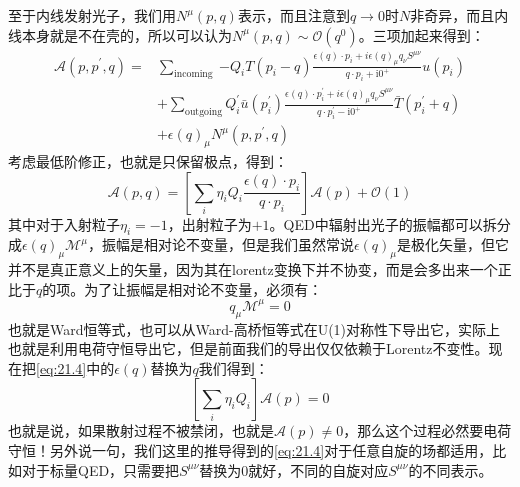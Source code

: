 至于内线发射光子，我们用$N^\mu(p,q)$表示，而且注意到$q\to0$时$N$非奇异，而且内线本身就是不在壳的，所以可以认为$N^\mu(p,q)\sim\mathcal{O}(q^0)$。三项加起来得到：
\begin{equation}\label{eq:21.3}
	\begin{aligned}
		\mathcal{A}(p,p^{\prime},q) =&\sum_\text{incoming }{ - Q _ i T ( p _ i - q )}\frac{\epsilon(q)\cdot p_i+i\epsilon(q)_{\mu}q_\nu S^{\mu\nu}}{q\cdot p_i+\mathrm{i}0^+}u(p_i)  \\
		&+\sum_{\mathrm{outgoing}}Q_{i}^{\prime}\bar{u}(p_{i}^{\prime})\frac{\epsilon(q)\cdot p_{i}^{\prime}+i\epsilon(q)_{\mu}q_{\nu}{S}^{\mu\nu}}{q\cdot p_{i}^{\prime}-\mathrm{i}0^+}\bar{T}(p_{i}^{\prime}+q)\\
		&+\epsilon(q)_{\mu}N^{\mu}(p,p^{\prime},q)
	\end{aligned}
\end{equation}
考虑最低阶修正，也就是只保留极点，得到：
\begin{equation}\label{eq:21.4}
	\boxed{
		\mathcal{A}(p,q)=\left[\sum_{i}\eta_iQ_{i}\frac{\epsilon(q)\cdot p_{i}}{q\cdot p_{i}}\right]\mathcal{A}(p)+\mathcal{O}(1)}
\end{equation}
其中对于入射粒子$\eta_i=-1$，出射粒子为$+1$。QED中辐射出光子的振幅都可以拆分成$\epsilon(q)_\mu \mathcal{M}^\mu$，振幅是相对论不变量，但是我们虽然常说$\epsilon(q)_\mu$是极化矢量，但它并不是真正意义上的矢量，因为其在lorentz变换下并不协变，而是会多出来一个正比于$q$的项\cite{Weinberg}。为了让振幅是相对论不变量，必须有：
\begin{equation}\label{eq:21.5}
	\boxed{
	q_\mu\mathcal{M}^\mu=0}
\end{equation}
也就是Ward恒等式，也可以从Ward-高桥恒等式在U(1)对称性下导出它，实际上也就是利用电荷守恒导出它，但是前面我们的导出仅仅依赖于Lorentz不变性。现在把\ref{eq:21.4}中的$\epsilon(q)$替换为$q$我们得到：
\begin{equation}\label{eq:21.6}
	\left[\sum_i\eta_i Q_i\right]\mathcal{A}(p)=0
\end{equation}
也就是说，如果散射过程不被禁闭，也就是$\mathcal{A}(p)\neq 0$，那么这个过程必然要电荷守恒！另外说一句，我们这里的推导得到的\ref{eq:21.4}对于任意自旋的场都适用，比如对于标量QED，只需要把$S^{\mu\nu}$替换为0就好，不同的自旋对应$S^{\mu\nu}$的不同表示。

